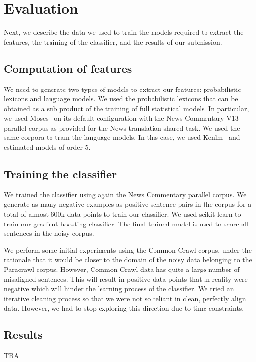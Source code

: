 \section{Evaluation}
\label{sec:results}

Next, we describe the data we used to train the models required to extract the features, the training of the classifier, and the results of our submission.

\subsection{Computation of features}

We need to generate two types of models to extract our features: probabilistic lexicons and language models. We used the probabilistic lexicons that can be obtained as a sub product of the training of full statistical models. In particular, we used Moses~\cite{Moses} on its default configuration with the News Commentary V13 parallel corpus as provided for the News translation shared task. We used the same corpora to train the language models. In this case, we used Kenlm~\cite{Kenlm} and estimated models of order $5$.


\subsection{Training the classifier}

We trained the classifier using again the News Commentary parallel corpus. We generate as many negative examples as positive sentence pairs in the corpus for a total of almost $600$k data points to train our classifier. We used scikit-learn to train our gradient boosting classifier. The final trained model is used to score all sentences in the noisy corpus.

We perform some initial experiments using the Common Crawl corpus, under the rationale that it would be closer to the domain of the noisy data belonging to the Paracrawl corpus. However, Common Crawl data has quite a large number of misaligned sentences. This will result in positive data points that in reality were negative which will hinder the learning process of the classifier. We tried an iterative cleaning process so that we were not so reliant in clean, perfectly align data. However, we had to stop exploring this direction due to time constraints.

\subsection{Results}
TBA